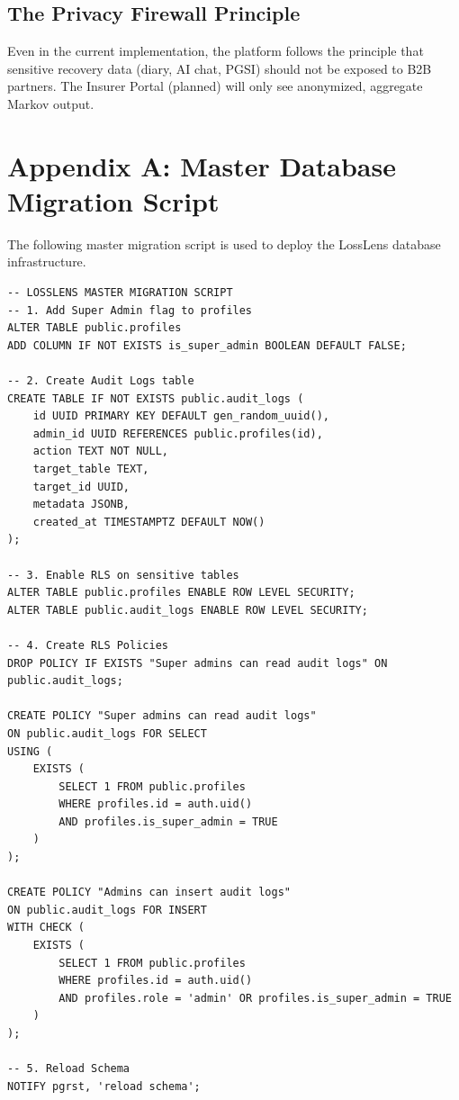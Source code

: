 \documentclass[11pt,a4paper]{article}
\begin{document}
\subsection{The Privacy Firewall Principle}
Even in the current implementation, the platform follows the principle that sensitive recovery data (diary, AI chat, PGSI) should not be exposed to B2B partners. The Insurer Portal (planned) will only see anonymized, aggregate Markov output.

\section{Appendix A: Master Database Migration Script}
The following master migration script is used to deploy the LossLens database infrastructure.

\lstset{language=SQL}
\begin{lstlisting}
-- LOSSLENS MASTER MIGRATION SCRIPT
-- 1. Add Super Admin flag to profiles
ALTER TABLE public.profiles
ADD COLUMN IF NOT EXISTS is_super_admin BOOLEAN DEFAULT FALSE;

-- 2. Create Audit Logs table
CREATE TABLE IF NOT EXISTS public.audit_logs (
    id UUID PRIMARY KEY DEFAULT gen_random_uuid(),
    admin_id UUID REFERENCES public.profiles(id),
    action TEXT NOT NULL,
    target_table TEXT,
    target_id UUID,
    metadata JSONB,
    created_at TIMESTAMPTZ DEFAULT NOW()
);

-- 3. Enable RLS on sensitive tables
ALTER TABLE public.profiles ENABLE ROW LEVEL SECURITY;
ALTER TABLE public.audit_logs ENABLE ROW LEVEL SECURITY;

-- 4. Create RLS Policies
DROP POLICY IF EXISTS "Super admins can read audit logs" ON public.audit_logs;

CREATE POLICY "Super admins can read audit logs"
ON public.audit_logs FOR SELECT
USING (
    EXISTS (
        SELECT 1 FROM public.profiles
        WHERE profiles.id = auth.uid()
        AND profiles.is_super_admin = TRUE
    )
);

CREATE POLICY "Admins can insert audit logs"
ON public.audit_logs FOR INSERT
WITH CHECK (
    EXISTS (
        SELECT 1 FROM public.profiles
        WHERE profiles.id = auth.uid()
        AND profiles.role = 'admin' OR profiles.is_super_admin = TRUE
    )
);

-- 5. Reload Schema
NOTIFY pgrst, 'reload schema';
\end{lstlisting}
\end{document}
